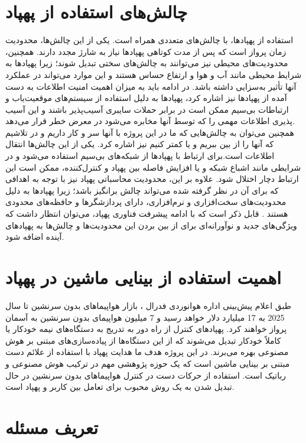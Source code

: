  \section{چالش‌های استفاده از پهپاد}
 استفاده از پهپادها، با چالش‌های متعددی همراه است. یکی از این چالش‌ها، محدودیت زمان پرواز است که پس از مدت کوتاهی پهپاد‌ها نیاز به شارژ مجدد دارند. 
 همچنین، محدودیت‌های محیطی نیز می‌توانند به چالش‌های سختی تبدیل شوند؛ زیرا پهپادها به شرایط محیطی مانند آب و هوا و ارتفاع حساس هستند و این موارد می‌تواند 
 در عملکرد آنها تأثیر به‌سزایی داشته باشد. در ادامه باید به میزان اهمیت امنیت اطلاعات به دست آمده از پهپاد‌ها نیز اشاره کرد، پهپادها به دلیل استفاده از سیستم‌های موقعیت‌یاب و ارتباطات بی‌سیم ممکن 
 است در برابر حملات سایبری آسیب‌پذیر باشند و این آسیب پذیری اطلاعات مهمی را که توسط آنها مخابره می‌شود در معرض خطر قرار می‌دهد.
 \\
 همچنین می‌توان به چالش‌هایی که ما در این پروژه با آنها سر و کار داریم و در تلاشیم که آنها را از بین ببریم و یا کمتر کنیم نیز اشاره کرد. 
   یکی از این چالش‌ها انتقال اطلاعات است.برای ارتباط با پهپادها از شبکه‌های بی‌سیم استفاده می‌شود و در شرایطی مانند اشباع شبکه  و یا افزایش فاصله بین پهپاد و کنترل‌کننده، ممکن است این ارتباط دچار اختلال شود.
 علاوه بر این، محدودیت محاسباتی پهپاد نیز با توجه به اهدافی که برای آن در نظر گرفته شده می‌تواند چالش برانگیز باشد؛ زیرا پهپادها به دلیل محدودیت‌های سخت‌افزاری و نرم‌افزاری، دارای پردازشگرها و حافظه‌های محدودی هستند \cite{hassanalian2017classifications}.
 قابل ذکر است که با ادامه پیشرفت فناوری پهپاد، می‌توان انتظار داشت که ویژگی‌های جدید و نوآورانه‌ای برای از بین بردن این محدودیت‌ها و چالش‌ها به‌ پهپادهای آینده اضافه شود.

 \section{اهمیت استفاده از بینایی ماشین در پهپاد}
 طبق اعلام پیش‌بینی اداره هوانوردی فدرال
 ، بازار هواپیماهای بدون سرنشین تا سال 2025 به 17 میلیارد دلار خواهد رسید و 7 میلیون هواپیمای بدون سرنشین به آسمان پرواز خواهند‌ کرد. پهپادهای کنترل
 از راه دور به تدریج به دستگاه‌های نیمه خودکار یا کاملاً خودکار تبدیل می‌شوند که از این دستگاه‌‌ها از پیاده‌سازی‌های مبتنی بر هوش مصنوعی بهره می‌برند. 
 در این پروژه هدف ما هدایت پهپاد با استفاده از علائم دست مبتنی بر بینایی ماشین است که یک حوزه پژوهشی مهم در ترکیب هوش مصنوعی و رباتیک است. 
 استفاده از حرکات دست در کنترل هواپیماهای بدون سرنشین در حال تبدیل شدن به یک روش محبوب برای تعامل بین کاربر و پهپاد است. 
 

\section{تعریف مسئله}

